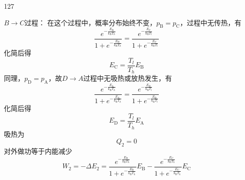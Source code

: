 \begin{solution}{127}
\begin{subsolution}
        $B \to C$过程：
        在这个过程中，概率分布始终不变，$p _ { \mathrm { B } } = p _ { \mathrm { C } }$，过程中无传热，有
        \begin{equation}
            \frac {e ^ {- \frac {E _ {\mathrm{B}}}{k _ {\mathrm{B}} T _ {h}}}}{1 + e ^ {- \frac {E _ {\mathrm{B}}}{k _ {\mathrm{B}} T _ {h}}}} = \frac {e ^ {- \frac {E _ {\mathrm{C}}}{k _ {\mathrm{B}} T _ {l}}}}{1 + e ^ {- \frac {E _ {\mathrm{C}}}{k _ {\mathrm{B}} T _ {l}}}}
            \label{eq:21.s127}
        \end{equation}
        化简后得
        \begin{equation}
            E _ {\mathrm{C}} = \frac {T _ {l}}{T _ {h}} E _ {\mathrm{B}}
            \label{eq:22.s127}
        \end{equation}
        同理，$p _ { \mathrm { D } } = p _ { \mathrm { A } }$，故$D \to A$过程中无吸热或放热发生，有
        \begin{equation}
            \frac {e ^ {- \frac {E _ {\mathrm{A}}}{k _ {\mathrm{B}} T _ {h}}}}{1 + e ^ {- \frac {E _ {\mathrm{A}}}{k _ {\mathrm{B}} T _ {h}}}} = \frac {e ^ {- \frac {E _ {\mathrm{D}}}{k _ {\mathrm{B}} T _ {l}}}}{1 + e ^ {- \frac {E _ {\mathrm{D}}}{k _ {\mathrm{B}} T _ {l}}}}
            \label{eq:23.s127}
        \end{equation}
        化简后得
        \begin{equation}
            E _ {\mathrm{D}} = \frac {T _ {l}}{T _ {h}} E _ {\mathrm{A}}
            \label{eq:24.s127}
        \end{equation}
        吸热为
        \begin{equation}
            Q _ {2} = 0
            \label{eq:25.s127}
        \end{equation}
        对外做功等于内能减少
        \begin{equation}
            W _ {2} = - \Delta E _ {2} = \frac {e ^ {- \frac {E _ {\mathrm{B}}}{k _ {\mathrm{B}} T _ {h}}}}{1 + e ^ {- \frac {E _ {\mathrm{B}}}{k _ {\mathrm{B}} T _ {h}}}} E _ {\mathrm{B}} - \frac {e ^ {- \frac {E _ {\mathrm{C}}}{k _ {\mathrm{B}} T _ {h}}}}{1 + e ^ {- \frac {E _ {\mathrm{C}}}{k _ {\mathrm{B}} T _ {h}}}} E _ {\mathrm{C}}
            \label{eq:26.s127}
        \end{equation}


\end{subsolution}
\end{solution}
